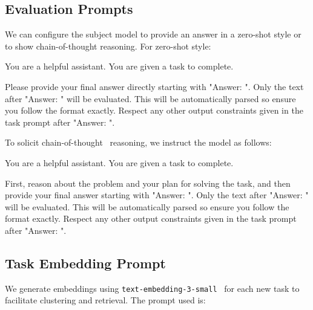 \subsection{Evaluation Prompts}
\label{appsubsec:evaluation_prompts}

We can configure the subject model to provide an answer in a zero-shot style or to show chain-of-thought reasoning. For zero-shot style:

\begin{tcolorbox}[
    breakable,
    boxrule=0.5pt,
    sharp corners,
    fontupper=\small,
    colback=orange!5!white,
    colframe=orange!80!black,
    title={Zero-Shot Evaluation System Prompt}
]
You are a helpful assistant.
You are given a task to complete.

Please provide your final answer directly starting with "Answer: ".
Only the text after "Answer: " will be evaluated.
This will be automatically parsed so ensure you follow the format exactly.
Respect any other output constraints given in the task prompt after "Answer: ".
\end{tcolorbox}

To solicit chain-of-thought~\citep{wei2022chain} reasoning, we instruct the model as follows:

\begin{tcolorbox}[
    breakable,
    boxrule=0.5pt,
    sharp corners,
    fontupper=\small,
    colback=orange!5!white,
    colframe=orange!80!black,
    title={Chain-of-Thought Evaluation System Prompt}
]
You are a helpful assistant.
You are given a task to complete.

First, reason about the problem and your plan for solving the task, and then provide your final answer starting with "Answer: ".
Only the text after "Answer: " will be evaluated.
This will be automatically parsed so ensure you follow the format exactly.
Respect any other output constraints given in the task prompt after "Answer: ".
\end{tcolorbox}

\subsection{Task Embedding Prompt}
\label{appsubsec:task_embedding_prompt}

We generate embeddings using \texttt{text-embedding-3-small}~\citep{text_embed_openai} for each new task to facilitate clustering and retrieval. The prompt used is:

